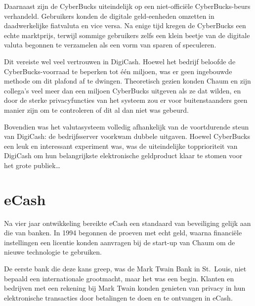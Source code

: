 \documentclass[smalldemyvopaper,11pt,twoside,onecolumn,openright,extrafontsizes,hidelinks]{memoir}
\begin{document}
Daarnaast zijn de CyberBucks uiteindelijk op een niet-officiële
CyberBucks-beurs verhandeld. Gebruikers konden de digitale geld-eenheden
omzetten in daadwerkelijke fiatvaluta en vice versa. Na enige tijd
kregen de CyberBucks een echte marktprijs, terwijl sommige gebruikers
zelfs een klein beetje van de digitale valuta begonnen te verzamelen als
een vorm van sparen of speculeren.

Dit vereiste wel veel vertrouwen in DigiCash. Hoewel het bedrijf
beloofde de CyberBucks-voorraad te beperken tot één miljoen, was er geen
ingebouwde methode om dit plafond af te dwingen. Theoretisch gezien
konden Chaum en zijn collega's veel meer dan een miljoen CyberBucks
uitgeven als ze dat wilden, en door de sterke privacyfuncties van het
systeem zou er voor buitenstaanders geen manier zijn om te controleren
of dit al dan niet was gebeurd.

Bovendien was het valutasysteem volledig afhankelijk van de voortdurende
steun van DigiCash: de bedrijfsserver voorkwam dubbele uitgaven. Hoewel
CyberBucks een leuk en interessant experiment was, was de uiteindelijke
topprioriteit van DigiCash om hun belangrijkste elektronische
geldproduct klaar te stomen voor het grote publiek\ldots{}

\section{eCash}\label{ecash}

Na vier jaar ontwikkeling bereikte eCash een standaard van beveiliging
gelijk aan die van banken. In 1994 begonnen de proeven met echt geld,
waarna financiële instellingen een licentie konden aanvragen bij de
start-up van Chaum om de nieuwe technologie te gebruiken.

De eerste bank die deze kans greep, was de Mark Twain Bank in St.~Louis,
niet bepaald een internationale grootmacht, maar het was een begin.
Klanten en bedrijven met een rekening bij Mark Twain konden genieten van
privacy in hun elektronische transacties door betalingen te doen en te
ontvangen in eCash.
\end{document}
